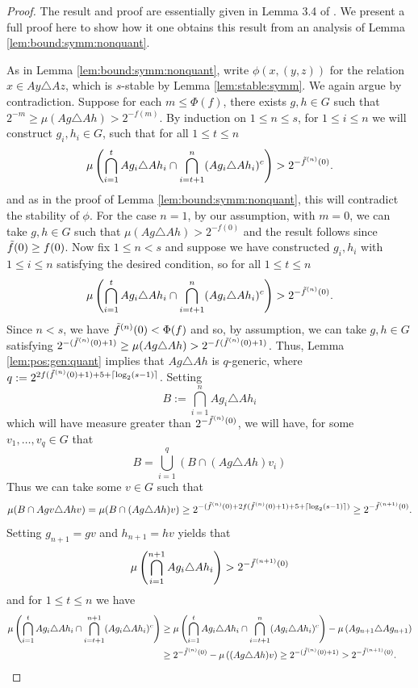 \documentclass[11pt]{amsart}
\theoremstyle{definition}
\theoremstyle{remark}
\begin{document}
\begin{proof}
    The result and proof are essentially given in Lemma 3.4 of \cite{conant2021quantitative}. We present a full proof here to show how it one obtains this result from an analysis of Lemma \ref{lem:bound:symm:nonquant}.

As in Lemma \ref{lem:bound:symm:nonquant}, write $\phi(x,(y,z))$ for the relation $x \in Ay \triangle Az$, which is $s$-stable by Lemma \ref{lem:stable:symm}. We again argue by contradiction. Suppose for each $m \le \Phi(f)$, there exists $g,h \in G$ such that $2^{-m}\ge \mu(Ag \triangle Ah) > 2^{-f(m)}$. 
By induction on $1 \le n \le s$,  for $1 \le i \le n$ we will construct $g_i,h_i \in G$, such that for all $1 \le t \le n$
\[
\mu\left(\bigcap_{i=1}^t Ag_i \triangle Ah_i \cap \bigcap_{i=t+1}^n(Ag_i \triangle Ah_i)^c\right)>2^{-\Tilde{f}^{(n)}(0)}.
\]
and as in the proof of  Lemma \ref{lem:bound:symm:nonquant}, this will  contradict the stability of $\phi$. For the case $n =1$, by our assumption, with $m=0$, we can take $g,h \in G$ such that $\mu(Ag \triangle Ah) >2^{-f(0)}$ and the result follows since $\Tilde{f}(0) \ge f(0)$. Now fix $1\le n < s$ and suppose we have constructed $g_i, h_i$ with $1 \le i \le n$ satisfying the desired condition, so for all $1 \le t \le n$
\[
\mu\left(\bigcap_{i=1}^t Ag_i \triangle Ah_i \cap \bigcap_{i=t+1}^n(Ag_i \triangle Ah_i)^c\right)> 2^{-\Tilde{f}^{(n)}(0)} .
\]
Since $n < s$, we have $\Tilde{f}^{(n)}(0) < \Phi(f)$ and so, by assumption, we can take $g,h \in G$ satisfying $2^{-(\Tilde{f}^{(n)}(0)+1)}\ge \mu(Ag \triangle Ah) >2^{-f(\Tilde{f}^{(n)}(0)+1)}$. Thus, Lemma \ref{lem:pos:gen:quant} implies that $Ag \triangle Ah$ is $q$-generic, where $q:=2^{2f(\Tilde{f}^{(n)}(0)+1)+5 +\lceil\log_2(s-1)\rceil}$. Setting 
\[
B:= \bigcap_{i=1}^n Ag_i \triangle Ah_i
\]
which will have measure greater than $2^{-\Tilde{f}^{(n)}(0)}$, we will have, for some $v_1, \ldots, v_q \in G$ that 
\[
B = \bigcup_{i=1}^q (B \cap (Ag \triangle Ah)v_i)
\]
 Thus we can take some $v \in G$ such that 
 \[
 \mu(B \cap Agv \triangle Ahv)=\mu(B \cap (Ag \triangle Ah)v)\ge 2^{-(\Tilde{f}^{(n)}(0)+ 2f(\Tilde{f}^{(n)}(0)+1)+5 +\lceil\log_2(s-1)\rceil)}\ge  2^{-\Tilde{f}^{(n+1)}(0)}.
 \]
 Setting $g_{n+1} = gv$ and $h_{n+1} = hv$ yields that 
\[
\mu\left(\bigcap_{i=1}^{n+1} Ag_i \triangle Ah_i \right)> 2^{-\Tilde{f}^{(n+1)}(0)}
\]
and for $1 \le t \le n$ we have 
\begin{equation*}
    \begin{aligned}
        \mu\left(\bigcap_{i=1}^t Ag_i \triangle Ah_i \cap \bigcap_{i=t+1}^{n+1}(Ag_i \triangle Ah_i)^c\right)&\ge \mu\left(\bigcap_{i=1}^t Ag_i \triangle Ah_i \cap \bigcap_{i=t+1}^n(Ag_i \triangle Ah_i)^c\right) - \mu\left(Ag_{n+1}\triangle Ag_{n+1}\right)\\
        & \ge 2^{-\Tilde{f}^{(n)}(0)} - \mu\left((Ag\triangle Ah)v\right) \ge 2^{-(\Tilde{f}^{(n)}(0)+1)}> 2^{-\Tilde{f}^{(n+1)}(0)} .
    \end{aligned}
\end{equation*}    
\end{proof}
\end{document}
